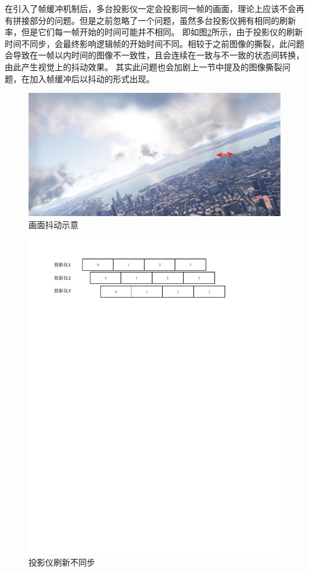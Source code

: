 \par
在引入了帧缓冲机制后，多台投影仪一定会投影同一帧的画面，理论上应该不会再有拼接部分的问题。但是之前忽略了一个问题，虽然多台投影仪拥有相同的刷新率，但是它们每一帧开始的时间可能并不相同。
即如图\ref{present}所示，由于投影仪的刷新时间不同步，会最终影响逻辑帧的开始时间不同。相较于之前图像的撕裂，此问题会导致在一帧以内时间的图像不一致性，且会连续在一致与不一致的状态间转换，由此产生视觉上的抖动效果。
其实此问题也会加剧上一节中提及的图像撕裂问题，在加入帧缓冲后以抖动的形式出现。
\begin{figure}[h!]
    \begin{center}
        \includegraphics[width=\textwidth]{pictures/jitter.png}
        \caption{画面抖动示意}
        \label{jitter}
    \end{center}
\end{figure}
\begin{figure}[h!]
    \begin{center}
        \includegraphics[width=\textwidth]{pictures/present.pdf}
        \caption{投影仪刷新不同步}
        \label{present}
    \end{center}
\end{figure}

